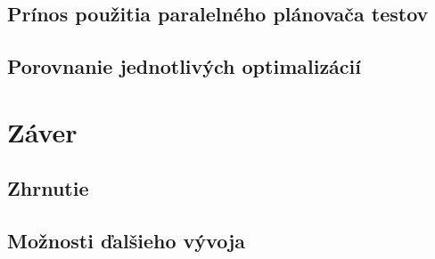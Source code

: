\section{Prínos použitia paralelného plánovača testov}
\label{sekcia:prinos_pouzitia}

\section{Porovnanie jednotlivých optimalizácií}
\label{sekcia:porovnanie_optimalizacii}

%
%
\chapter{Záver}
\label{kapitola:zaver}

\section{Zhrnutie}
\label{sekcia:zhrnutie}

\section{Možnosti ďalšieho vývoja}
\label{sekcia:moznosti_dalsieho_vyvoja}
